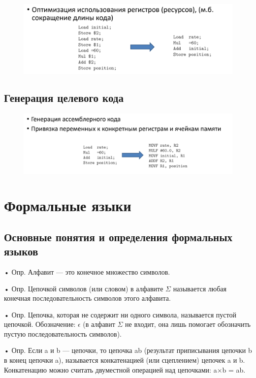 \documentclass{article}
\begin{document}
\begin{figure}[H]
    \centering
    \includegraphics[width=1\linewidth]{Снимок экрана 2025-02-13 093155.png}
\end{figure}

\subsection{Генерация целевого кода}

\begin{figure}[H]
    \centering
    \includegraphics[width=1\linewidth]{Снимок экрана 2025-02-13 093218.png}
\end{figure}

\section{Формальные языки}

\subsection{Основные понятия и определения формальных языков}

• Опр. Алфавит — это конечное множество символов.

• Опр. Цепочкой символов (или словом) в алфавите $\Sigma$ называется любая конечная
последовательность символов этого алфавита.

• Опр. Цепочка, которая не содержит ни одного символа, называется пустой
цепочкой. Обозначение: $\epsilon$ (в алфавит $\Sigma$ не входит, она лишь помогает обозначить
пустую последовательность символов).

• Опр. Если a и b — цепочки, то цепочка ab (результат приписывания цепочки b в
конец цепочки a), называется конкатенацией (или сцеплением) цепочек a и b.
Конкатенацию можно считать двуместной операцией над цепочками: a×b = ab.
\end{document}
